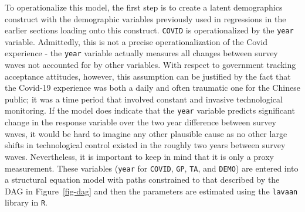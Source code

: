 \documentclass[
  letterpaper,
  DIV=11,
  numbers=noendperiod]{scrartcl}
\begin{document}
To operationalize this model, the first step is to create a latent
demographics construct with the demographic variables previously used in
regressions in the earlier sections loading onto this construct.
\texttt{COVID} is operationalized by the \texttt{year} variable.
Admittedly, this is not a precise operationalization of the Covid
experience - the \texttt{year} variable actually measures all changes
between survey waves not accounted for by other variables. With respect
to government tracking acceptance attitudes, however, this assumption
can be justified by the fact that the Covid-19 experience was both a
daily and often traumatic one for the Chinese public; it was a time
period that involved constant and invasive technological monitoring. If
the model does indicate that the \texttt{year} variable predicts
significant change in the response variable over the two year difference
between survey waves, it would be hard to imagine any other plausible
cause as no other large shifts in technological control existed in the
roughly two years between survey waves. Nevertheless, it is important to
keep in mind that it is only a proxy measurement. These variables
(\texttt{year} for \texttt{COVID}, \texttt{GP}, \texttt{TA}, and
\texttt{DEMO}) are entered into a structural equation model with paths
constrained to that described by the DAG in Figure~\ref{fig-dag} and
then the parameters are estimated using the \texttt{lavaan} library in
\texttt{R}.
\end{document}
